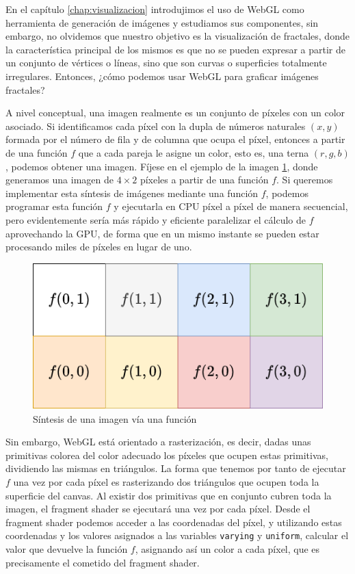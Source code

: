 %
%

En el capítulo \ref{chap:visualizacion} introdujimos el uso de WebGL como herramienta de generación de imágenes y estudiamos sus componentes, sin embargo, no olvidemos que nuestro objetivo es la visualización de fractales, donde la característica principal de los mismos es que no se pueden expresar a partir de un conjunto de vértices o líneas, sino que son curvas o superficies totalmente irregulares. Entonces, ¿cómo podemos usar WebGL para graficar imágenes fractales?

A nivel conceptual, una imagen realmente es un conjunto de píxeles con un color asociado. Si identificamos cada píxel con la dupla de números naturales $(x,y)$ formada por el número de fila y de columna que ocupa el píxel, entonces a partir de una función $f$ que a cada pareja le asigne un color, esto es, una terna $(r,g,b)$, podemos obtener una imagen. Fíjese en el ejemplo de la imagen \ref{fig:sintesis-imagenes-f}, donde generamos una imagen de $4\times 2$ píxeles a partir de una función $f$. Si queremos implementar esta síntesis de imágenes mediante una función $f$, podemos programar esta función $f$ y ejecutarla en CPU píxel a píxel de manera secuencial, pero evidentemente sería más rápido y eficiente paralelizar el cálculo de $f$ aprovechando la GPU, de forma que en un mismo instante se pueden estar procesando miles de píxeles en lugar de uno. 

\begin{figure} [ht]
    \centering
    \includegraphics[scale = 0.4]{img/C6/sintesis-imagenes-f.png}
    \caption{Síntesis de una imagen vía una función}
    \label{fig:sintesis-imagenes-f}
\end{figure}


Sin embargo, WebGL está orientado a rasterización, es decir, dadas unas primitivas colorea del color adecuado los píxeles que ocupen estas primitivas, dividiendo las mismas en triángulos. La forma que tenemos por tanto de ejecutar $f$ una vez por cada píxel es rasterizando dos triángulos que ocupen toda la superficie del canvas. Al existir dos primitivas que en conjunto cubren toda la imagen, el fragment shader se ejecutará una vez por cada píxel. Desde el fragment shader podemos acceder a las coordenadas del píxel, y utilizando estas coordenadas y los valores asignados a las variables \verb|varying| y \verb|uniform|, calcular el valor que devuelve la función $f$, asignando así un color a cada píxel, que es precisamente el cometido del fragment shader.

